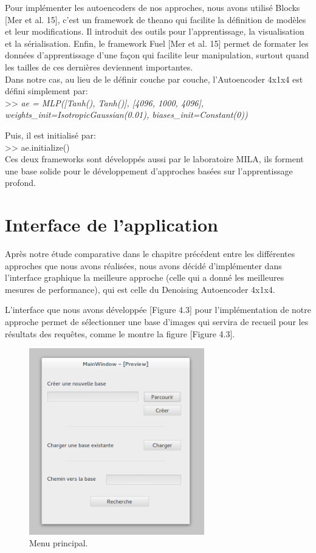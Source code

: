 	Pour implémenter les autoencoders de nos approches, nous avons utilisé Blocks [Mer et al. 15], c'est un framework de theano qui facilite la définition de modèles et leur modifications. Il introduit des outils pour l'apprentissage, la visualisation et la sérialisation. Enfin, le framework Fuel [Mer et al. 15] permet de formater les données d'apprentissage d'une façon qui facilite leur manipulation, surtout quand les tailles de ces dernières deviennent importantes.\\

	Dans notre cas, au lieu de le définir couche par couche, l'Autoencoder 4x1x4 est défini simplement par:\\

>> \textit{ae = MLP([Tanh(), Tanh()], [4096, 1000, 4096],
              weights\_init=IsotropicGaussian(0.01),
              biases\_init=Constant(0))\\
   }           

Puis, il est initialisé par:\\

>> ae.initialize()\\

	Ces deux frameworks sont développés aussi par le laboratoire MILA, ils forment une base solide pour le développement d’approches basées sur l'apprentissage profond.

\section{Interface de l'application}

	Après notre étude comparative dans le chapitre précédent entre les différentes approches que nous avons réalisées, nous avons décidé d'implémenter dans l'interface graphique la meilleure approche (celle qui a donné les meilleures mesures de performance), qui est celle du Denoising Autoencoder 4x1x4.

	L'interface que nous avons développée [Figure 4.3] pour l'implémentation de notre approche permet de sélectionner une base d'images qui servira de recueil pour les résultats des requêtes, comme le montre la figure [Figure 4.3].


\begin{figure}[H]
	\centering
		\includegraphics[width=3in]{Figures/mainMenu.png}
	\caption[Menu principal]{Menu principal.}
	\label{fig:Electron}
\end{figure}

